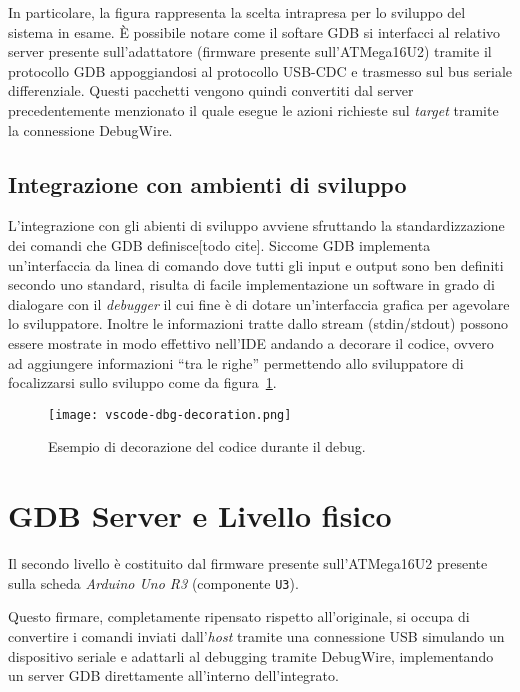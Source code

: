 In particolare, la figura rappresenta la scelta intrapresa per lo sviluppo del sistema in esame. È possibile notare come il softare GDB si interfacci al relativo server presente sull'adattatore (firmware presente sull'ATMega16U2) tramite il protocollo GDB appoggiandosi al protocollo USB-CDC e trasmesso sul bus seriale differenziale.
Questi pacchetti vengono quindi convertiti dal server precedentemente menzionato il quale esegue le azioni richieste sul \textit{target} tramite la connessione DebugWire.

\subsection{Integrazione con ambienti di sviluppo}

L'integrazione con gli abienti di sviluppo avviene sfruttando la standardizzazione dei comandi che GDB definisce[todo cite]. Siccome GDB implementa un'interfaccia da linea di comando dove tutti gli input e output sono ben definiti secondo uno standard, risulta di facile implementazione un software in grado di dialogare con il \textit{debugger} il cui fine è di dotare un'interfaccia grafica per agevolare lo sviluppatore. Inoltre le informazioni tratte dallo stream (stdin/stdout) possono essere mostrate in modo effettivo nell'IDE andando a decorare il codice, ovvero ad aggiungere informazioni ``tra le righe'' permettendo allo sviluppatore di focalizzarsi sullo sviluppo come da figura~\ref{fig:vscode-dbg-dec}.

\begin{figure}[t]
    \centering
    \texttt{[image: vscode-dbg-decoration.png]}
    \caption[]{Esempio di decorazione del codice durante il debug.}\label{fig:vscode-dbg-dec}
\end{figure}

\section{GDB Server e Livello fisico}

Il secondo livello è costituito dal firmware presente sull'ATMega16U2 presente sulla scheda \textit{Arduino Uno R3} (componente \texttt{U3}).

Questo firmare, completamente ripensato rispetto all'originale, si occupa di convertire i comandi inviati dall'\textit{host} tramite una connessione USB simulando un dispositivo seriale e adattarli al debugging tramite DebugWire, implementando un server GDB direttamente all'interno dell'integrato.

